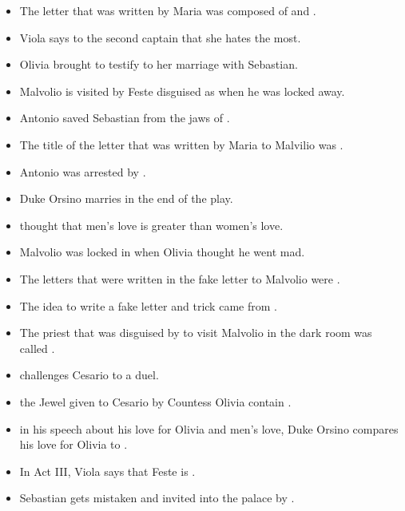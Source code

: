 \documentclass[12pt, a4paper]{article}
\begin{document}
\begin{itemize}
  \item[\ding{109}]  The letter that was written by Maria was composed of  and .
                                                                                                       
  \item[\ding{109}]  Viola says to the second captain that she hates  the most.

  \item[\ding{109}] Olivia brought  to testify to her marriage with Sebastian.


  \item[\ding{109}] Malvolio is visited by Feste disguised as  when he was locked away.

  \item[\ding{109}] Antonio saved Sebastian from the jaws of .

  \item[\ding{109}] The title of the letter that was written by Maria to Malvilio was .

  \item[\ding{109}] Antonio was arrested by .

    
  \item[\ding{109}] Duke Orsino marries  in the end of the play.
  \item[\ding{109}]  thought that men's love is greater than women's love.
  \item[\ding{109}] Malvolio was locked in  when Olivia thought he went mad.

  
  \item[\ding{109}] The letters that were written in the fake letter to Malvolio were .
  \item[\ding{109}] The idea to write a fake letter and trick  came from .
  \item[\ding{109}] The priest that was disguised by   to visit Malvolio in the dark room was 
    called .

  \item[\ding{109}]  challenges Cesario to a duel.
  \item[\ding{109}]  the Jewel given to Cesario by Countess Olivia contain .
  \item[\ding{109}] in his speech about his love for Olivia and men's love, Duke Orsino compares his
    love for Olivia to .
  \item[\ding{109}] In Act III, Viola says that Feste is .

  \item[\ding{109}] Sebastian gets mistaken and invited into the palace by .

\end{itemize}
\end{document}
